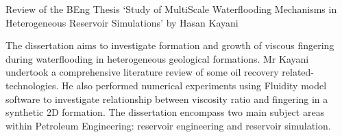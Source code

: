 \documentclass[14pt,twoside]{report}
\begin{document}
\vfill
\clearpage




\bigskip

\begin{center}
  {\Large Review of the BEng Thesis `Study of MultiScale Waterflooding Mechanisms in Heterogeneous Reservoir Simulations' by Hasan Kayani}
\end{center}
The dissertation aims to investigate formation and growth of viscous fingering during waterflooding in heterogeneous geological formations. Mr Kayani undertook a comprehensive literature review of some oil recovery related-technologies. He also performed numerical experiments using Fluidity model software to investigate relationship between viscosity ratio and fingering in a synthetic 2D formation. The dissertation encompass two main subject areas within Petroleum Engineering: reservoir engineering and reservoir simulation.
\end{document}
